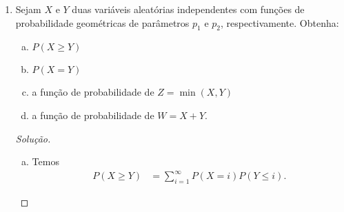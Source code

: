 \documentclass[../Notas.tex]{subfiles}
\begin{document}
\begin{enumerate}
\begin{proof}[Solução]
\begin{enumerate}[a)]
\begin{align*}
                       &= \frac{2(N-k) + 1}{(N+1)^2}
            \end{align*}
            e, caso contrário, $P(Z=k) = 0.$
            \item Para $k=0,1,\dots,N$, temos
            \begin{align*}
                P(W = k) &= P(X=k)P(Y=k) + P(X=k)P(Y<k) + P(X<k)P(Y=k) \\
                         &= \frac{1}{(N+1)^2} + 2\frac{k}{(N+1)^2} \\
                         &= \frac{2k + 1}{(N+1)^2}
            \end{align*}
            e, caso contrário, $P(W=k) = 0$.
            \item Para $k=0$, temos
            \[
            P(U=k) = P(X=Y) = \frac{1}{N+1}.
            \]
            Para $k=1, \dots, N$, temos
            \begin{align*}
                P(U=k) &= 2P(X = Y+k) \\
                       &= 2[P(X=k)P(Y=0) + P(X=k+1)P(Y=1) + \cdots + P(X=N)P(Y = N-k)] \\
                       &= 2\frac{N-k+1}{(N+1)^2}
            \end{align*}
            e, para $k\notin\{0, 1, \dots, N\}$, temos $P(U=k) = 0$.
        \end{enumerate}
    \end{proof}
    \item Sejam $X$ e $Y$ duas variáveis aleatórias independentes com funções de probabilidade geométricas de parâmetros $p_1$ e $p_2$, respectivamente. Obtenha:
    \begin{enumerate}[a)]
    \item $P(X\geq Y)$
    \item $P(X=Y)$
    \item a função de probabilidade de $Z=\min(X,Y)$
    \item a função de probabilidade de $W = X+Y$.
    \end{enumerate}
    \begin{proof}[Solução]
        \begin{enumerate}[a)]
            \item Temos
            \begin{align*}
                P(X\geq Y) &= \sum_{i=1}^{\infty} P(X=i)P(Y\leq i).
            \end{align*}

\end{enumerate}
\end{proof}
\end{enumerate}
\end{document}
